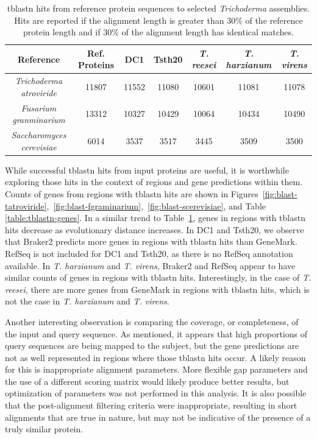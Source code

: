 \begin{table}
  \centering
  \begin{tabular}{|c|c|c|c|c|c|c|}
    \hline
    Reference & Ref. Proteins & DC1 & Tsth20 & \textit{T. reesei} & \textit{T. harzianum} & \textit{T. virens}  \\ \hline
    \textit{Trichoderma atroviride} & 11807 & 11552 & 11080 & 10601 & 11081 & 11078 \\ \hline 
    \textit{Fusarium granminarium} & 13312 & 10327 & 10429 & 10064 & 10434 & 10490 \\ \hline
    \textit{Saccharomyces cerevisiae} & 6014 & 3537 & 3517 & 3445 & 3509 & 3500 \\ \hline
  \end{tabular}
  \caption[Overview of tblastn alignments]{tblastn hits from reference protein sequences to selected
    \textit{Trichoderma} assemblies. Hits are reported if the
    alignment length is greater than 30\% of the reference protein
    length and if 30\% of the alignment length has identical
    matches.}
  \label{table:tblastn-prots}
\end{table}

While successful tblastn hits from input proteins are useful, it is
worthwhile exploring those hits in the context of regions and gene
predictions within them. Counts of genes from regions with tblastn
hits are shown in Figures~\ref{fig:blast-tatroviride},~\ref{fig:blast-fgraminarium},~\ref{fig:blast-scerevisiae}, and Table \ref{table:tblastn-genes}. In a similar trend
to Table~\ref{table:tblastn-prots}, genes in regions with tblastn hits
decrease as evolutionary distance increases. In DC1 and Tsth20, we
observe that Braker2 predicts more genes in regions with tblastn hits
than GeneMark. RefSeq is not included for DC1 and Tsth20, as there is
no RefSeq annotation available. In \textit{T. harzianum} and
\textit{T. virens}, Braker2 and RefSeq appear to have similar counts
of genes in regions with tblastn hits. Interestingly, in the case of
\textit{T. reesei}, there are more genes from GeneMark in regions with
tblastn hits, which is not the case in \textit{T. harzianum} and
\textit{T. virens}.

Another interesting observation is comparing the coverage, or
completeness, of the input and query sequence. As mentioned, it
appears that high proportions of query sequences are being mapped to
the subject, but the gene predictions are not as well represented in
regions where those tblastn hits occur. A likely reason for this is
inappropriate alignment parameters. More flexible gap parameters and
the use of a different scoring matrix would likely produce better
results, but optimization of parameters was not performed in this
analysis. It is also possible that the post-alignment filtering
criteria were inappropriate, resulting in short alignments that are
true in nature, but may not be indicative of the presence of a truly
similar protein.

